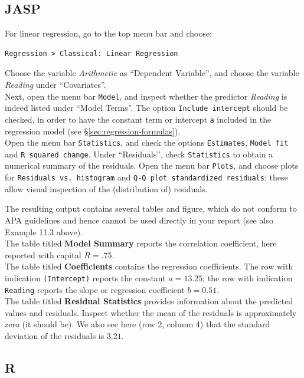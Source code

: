 \documentclass[
]{book}
\begin{document}
\hypertarget{jasp-7}{%
\subsection{JASP}\label{jasp-7}}

For linear regression, go to the top menu bar and choose:

\begin{verbatim}
Regression > Classical: Linear Regression
\end{verbatim}

Choose the variable \emph{Arithmetic} as ``Dependent Variable'', and choose the variable \emph{Reading} under ``Covariates''.\\
Next, open the menu bar \texttt{Model}, and inspect whether the predictor \emph{Reading} is indeed listed under ``Model Terms''. The option \texttt{Include\ intercept} should be checked, in order to have the constant term or intercept \texttt{a} included in the regression model (see §\ref{sec:regression-formulas}).\\
Open the menu bar \texttt{Statistics}, and check the options \texttt{Estimates}, \texttt{Model\ fit} and \texttt{R\ squared\ change}.
Under ``Residuals'', check \texttt{Statistics} to obtain a numerical summary of the residuals.
Open the menu bar \texttt{Plots}, and choose plots for \texttt{Residuals\ vs.\ histogram} and \texttt{Q-Q\ plot\ standardized\ residuals}; these allow visual inspection of the (distribution of) residuals.

The resulting output contains several tables and figure, which do not conform to APA guidelines and hence cannot be used directly in your report (see also Example 11.3 above).\\
The table titled \textbf{Model Summary} reports the correlation coefficient, here reported with capital \(R=.75\).\\
The table titled \textbf{Coefficients} contains the regression coefficients. The row with indication \texttt{(Intercept)} reports the constant \(a=13.25\); the row with indication \texttt{Reading} reports the slope or regression coefficient \(b=0.51\).\\
The table titled \textbf{Residual Statistics} provides information about the predicted values and residuals. Inspect whether the mean of the residuals is approximately zero (it should be). We also see here (row 2, column 4) that the standard deviation of the residuals is \(3.21\).

\hypertarget{r-8}{%
\subsection{R}\label{r-8}}
\end{document}
